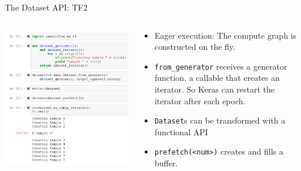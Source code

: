 \documentclass[t, 10pt, aspectratio=1610]{beamer}
\begin{document}
\begin{frame}[fragile]{The Dataset API: TF2}

\begin{columns}
\begin{column}{0.5\textwidth}

\includegraphics[height=0.8\textheight]{dataset_tf2.PNG}


\end{column}
\begin{column}{0.5\textwidth}  %
    \begin{itemize}
        \item Eager execution: The compute graph is constructed on the fly.
        \item \texttt{from\_generator} receives a generator function, a callable that creates an iterator. So Keras can restart the iterator after each epoch.
        \item \texttt{Dataset}s can be transformed with a functional API
        \item \texttt{prefetch(<num>)} creates and fills a buffer.
    \end{itemize}
    
\end{column}
\end{columns}


    
\end{frame}
\end{document}
